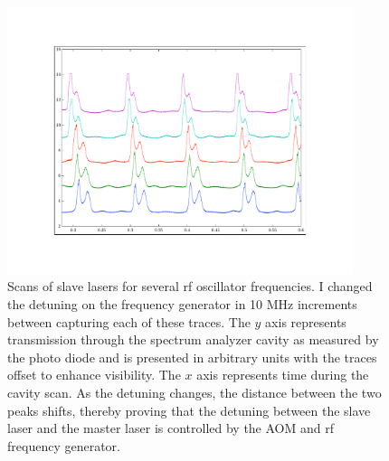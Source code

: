  
\begin{figure}
    \centerline{\includegraphics[width=0.9\textwidth]{sampleOffsetData}}
    \caption[Scans of slave lasers for several rf oscillator frequencies]{\label{fig:typicaldata}
Scans of slave lasers for several rf oscillator frequencies. I changed the detuning on the frequency generator in 10 MHz increments between capturing each of these traces. The $y$ axis represents transmission through the spectrum analyzer cavity as measured by the photo diode and is presented in arbitrary units with the traces offset to enhance visibility. The $x$ axis represents time during the cavity scan. As the detuning changes, the distance between the two peaks shifts, thereby proving that the detuning between the slave laser and the master laser is controlled by the AOM and rf frequency generator.}
\end{figure}



